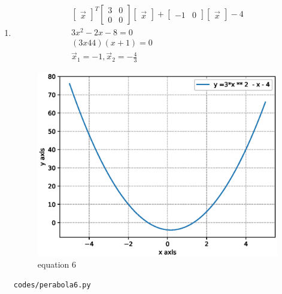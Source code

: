 \begin{enumerate}[label=\arabic*.,ref=\thesubsection.\theenumi]
\item
\begin{align}
\begin{bmatrix}\vec x\end{bmatrix}^T\begin{bmatrix}3 & 0\\0 & 0\end{bmatrix}\begin{bmatrix}\vec x\end{bmatrix} + \begin{bmatrix}-1 & 0\end{bmatrix}\begin{bmatrix}\vec x\end{bmatrix} -4
\\
3x^2-2x-8 = 0
\\
\left(3x 44\right)\left(x + 1\right) = 0
\\
\vec x_1 = -1,\vec x_2 =-\frac{4}{3}
\end{align}
\begin{figure}[!ht]
	\centering
	\includegraphics[width=\columnwidth]{./figures/perabola6.eps}
	\caption{equation 6 }
	\label{fig:perabola6}
\end{figure}
\begin{lstlisting}
codes/perabola6.py
\end{lstlisting}

\end{enumerate}
